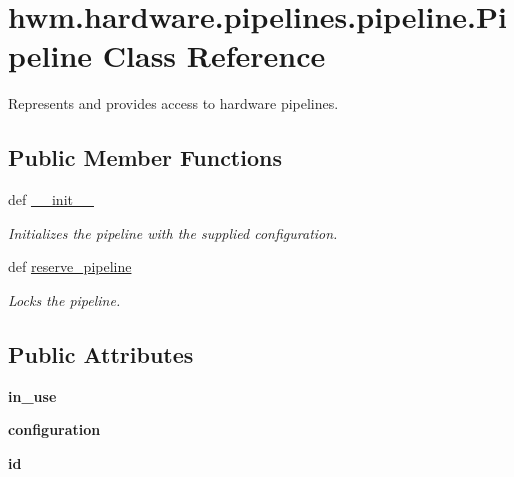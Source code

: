 \hypertarget{classhwm_1_1hardware_1_1pipelines_1_1pipeline_1_1_pipeline}{\section{hwm.\-hardware.\-pipelines.\-pipeline.\-Pipeline Class Reference}
\label{classhwm_1_1hardware_1_1pipelines_1_1pipeline_1_1_pipeline}
}


Represents and provides access to hardware pipelines.  


\subsection*{Public Member Functions}
\begin{DoxyCompactItemize}
\item 
def \hyperlink{classhwm_1_1hardware_1_1pipelines_1_1pipeline_1_1_pipeline_aed56445fa619c9390ffeba92d924c861}{\-\_\-\-\_\-init\-\_\-\-\_\-}
\begin{DoxyCompactList}\small\item\em Initializes the pipeline with the supplied configuration. \end{DoxyCompactList}\item 
def \hyperlink{classhwm_1_1hardware_1_1pipelines_1_1pipeline_1_1_pipeline_a75e2d36779704a689c0695a3065a69b9}{reserve\-\_\-pipeline}
\begin{DoxyCompactList}\small\item\em Locks the pipeline. \end{DoxyCompactList}\end{DoxyCompactItemize}
\subsection*{Public Attributes}
\begin{DoxyCompactItemize}
\item 
\hypertarget{classhwm_1_1hardware_1_1pipelines_1_1pipeline_1_1_pipeline_a06d0e6687fa8cf71f730ba65704ecc81}{{\bfseries in\-\_\-use}}\label{classhwm_1_1hardware_1_1pipelines_1_1pipeline_1_1_pipeline_a06d0e6687fa8cf71f730ba65704ecc81}

\item 
\hypertarget{classhwm_1_1hardware_1_1pipelines_1_1pipeline_1_1_pipeline_a6a975003dd74bf7c6f201627d61fdc71}{{\bfseries configuration}}\label{classhwm_1_1hardware_1_1pipelines_1_1pipeline_1_1_pipeline_a6a975003dd74bf7c6f201627d61fdc71}

\item 
\hypertarget{classhwm_1_1hardware_1_1pipelines_1_1pipeline_1_1_pipeline_a3227f17d687d49dd432118445e715e29}{{\bfseries id}}\label{classhwm_1_1hardware_1_1pipelines_1_1pipeline_1_1_pipeline_a3227f17d687d49dd432118445e715e29}

\end{DoxyCompactItemize}

